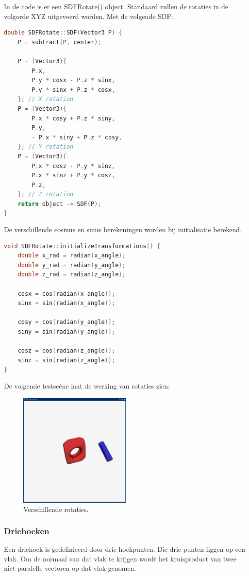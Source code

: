 \documentclass[12pt, a4paper]{article}
\begin{document}
In de code is er een SDFRotate() object. Standaard zullen de rotaties in de volgorde XYZ uitgevoerd worden. Met de volgende SDF:
\begin{lstlisting}[language=C++]
double SDFRotate::SDF(Vector3 P) {
    P = subtract(P, center);

    P = (Vector3){
        P.x,
        P.y * cosx - P.z * sinx,
        P.y * sinx + P.z * cosx,
    }; // X rotation
    P = (Vector3){
        P.x * cosy + P.z * siny,
        P.y,
        - P.x * siny + P.z * cosy,
    }; // Y rotation
    P = (Vector3){
        P.x * cosz - P.y * sinz,
        P.x * sinz + P.y * cosz,
        P.z,
    }; // Z rotation
    return object -> SDF(P);
}
\end{lstlisting}

De verschillende cosinus en sinus berekeningen worden bij initialisatie berekend.

\begin{lstlisting}[language=C++]
void SDFRotate::initializeTransformations() {
    double x_rad = radian(x_angle);
    double y_rad = radian(y_angle);
    double z_rad = radian(z_angle);

    cosx = cos(radian(x_angle));
    sinx = sin(radian(x_angle));

    cosy = cos(radian(y_angle));
    siny = sin(radian(y_angle));

    cosz = cos(radian(z_angle));
    sinz = sin(radian(z_angle));
}
\end{lstlisting}

De volgende testscène laat de werking van rotaties zien:

\begin{figure}[H]
    \centering
    \includegraphics[width=0.50\textwidth]{renders/rotaties.png}
    \caption{Verschillende rotaties.}
    \label{fig:rotaties}
\end{figure}
\subsubsection{Driehoeken}
Een driehoek is gedefinieerd door drie hoekpunten. Die drie punten liggen op een vlak. Om de normaal van dat vlak te krijgen wordt het kruisproduct van twee niet-paralelle vectoren op dat vlak genomen. 
\end{document}
